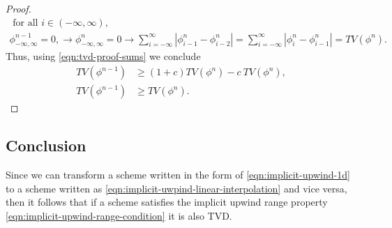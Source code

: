 \documentclass[../thesis.tex]{subfiles}
\begin{document}
\begin{theorem}
\begin{proof}
\begin{equation}
\begin{split}
        \text{ for all } i \in (-\infty,\infty),
        \\
        \phi_{-\infty,\infty}^{n-1} = 0,
        \rightarrow
        \phi_{-\infty,\infty}^{n} = 0
        \rightarrow
        \sum_{i=-\infty}^{\infty} |\phi_{i-1}^{n} - \phi_{i-2}^{n}|
        = \sum_{i=-\infty}^{\infty}|\phi_{i}^{n} - \phi_{i-1}^{n}|
        =TV(\phi^{n}).
    \end{split}
\end{equation}
Thus, using \eqref{eqn:tvd-proof-sums} we conclude
\begin{equation}
    \begin{split}
        TV(\phi^{n-1})
        &\geq
        (1+c)TV(\phi^{n}) - c~TV(\phi^{n}),
        \\
        TV(\phi^{n-1})
        &\geq
        TV(\phi^{n}).
    \end{split}
\end{equation}
\end{proof}
\end{theorem}
\subsection{Conclusion}
Since we can transform a scheme written in the form of \eqref{eqn:implicit-upwind-1d}
to a scheme written as \eqref{eqn:implicit-uwpind-linear-interpolation} and
vice versa, then it follows that if a scheme satisfies the implicit upwind range property \eqref{eqn:implicit-upwind-range-condition} it is also TVD.
\end{document}
